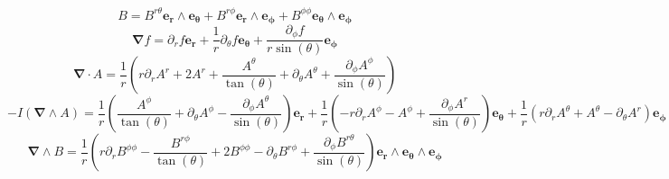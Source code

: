 \documentclass[10pt,fleqn]{report}
\newcommand{\W}{\wedge}
\begin{document}
\begin{equation*} B = B^{r\theta }  \boldsymbol{e_{r}\wedge e_{\theta }} + B^{r\phi }  \boldsymbol{e_{r}\wedge e_{\phi }} + B^{\phi \phi }  \boldsymbol{e_{\theta }\wedge e_{\phi }} \end{equation*}
\begin{equation*} \boldsymbol{\nabla}  f = \partial_{r} f  \boldsymbol{e_{r}} + \frac{1}{r} \partial_{\theta } f  \boldsymbol{e_{\theta }} + \frac{\partial_{\phi } f }{r \sin{\left (\theta  \right )}} \boldsymbol{e_{\phi }} \end{equation*}
\begin{equation*} \boldsymbol{\nabla} \cdot A = \frac{1}{r} \left(r \partial_{r} A^{r}  + 2 A^{r}  + \frac{A^{\theta } }{\tan{\left (\theta  \right )}} + \partial_{\theta } A^{\theta }  + \frac{\partial_{\phi } A^{\phi } }{\sin{\left (\theta  \right )}}\right) \end{equation*}
\begin{equation*} -I (\boldsymbol{\nabla} \W A) = \frac{1}{r} \left(\frac{A^{\phi } }{\tan{\left (\theta  \right )}} + \partial_{\theta } A^{\phi }  - \frac{\partial_{\phi } A^{\theta } }{\sin{\left (\theta  \right )}}\right) \boldsymbol{e_{r}} + \frac{1}{r} \left(- r \partial_{r} A^{\phi }  - A^{\phi }  + \frac{\partial_{\phi } A^{r} }{\sin{\left (\theta  \right )}}\right) \boldsymbol{e_{\theta }} + \frac{1}{r} \left(r \partial_{r} A^{\theta }  + A^{\theta }  - \partial_{\theta } A^{r} \right) \boldsymbol{e_{\phi }} \end{equation*}
\begin{equation*} \boldsymbol{\nabla} \W B = \frac{1}{r} \left(r \partial_{r} B^{\phi \phi }  - \frac{B^{r\phi } }{\tan{\left (\theta  \right )}} + 2 B^{\phi \phi }  - \partial_{\theta } B^{r\phi }  + \frac{\partial_{\phi } B^{r\theta } }{\sin{\left (\theta  \right )}}\right) \boldsymbol{e_{r}\wedge e_{\theta }\wedge e_{\phi }} \end{equation*}
\end{document}
